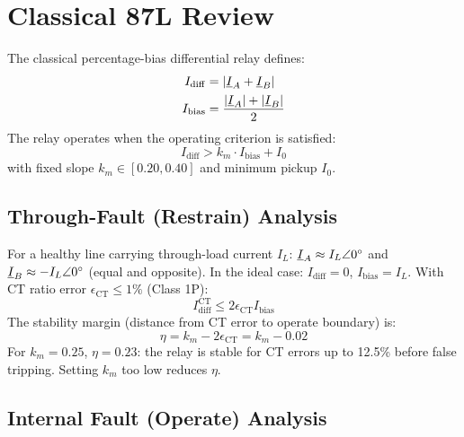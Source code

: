\section{Classical 87L Review}
\label{sec:ch4_review}

The classical percentage-bias differential relay defines:
\begin{align}
  I_\mathrm{diff} &= |\underline{I}_A + \underline{I}_B|
  \label{eq:ch4_idiff_def} \\
  I_\mathrm{bias} &= \frac{|\underline{I}_A| + |\underline{I}_B|}{2}
  \label{eq:ch4_ibias_def}
\end{align}
The relay operates when the operating criterion is satisfied:
\begin{equation}
  \boxed{I_\mathrm{diff} > k_m \cdot I_\mathrm{bias} + I_0}
  \label{eq:ch4_87l_criterion}
\end{equation}
with fixed slope $k_m \in [0.20, 0.40]$ and minimum pickup $I_0$.

\subsection{Through-Fault (Restrain) Analysis}

For a healthy line carrying through-load current $I_L$:
$\underline{I}_A \approx I_L\angle 0^\circ{}$ and $\underline{I}_B \approx -I_L\angle 0^\circ{}$
(equal and opposite). In the ideal case:
$I_\mathrm{diff} = 0$, $I_\mathrm{bias} = I_L$.
With CT ratio error $\epsilon_\mathrm{CT} \leq 1\%$ (Class 1P):
\begin{equation}
  I_\mathrm{diff}^\mathrm{CT} \leq 2\epsilon_\mathrm{CT} I_\mathrm{bias}
  \label{eq:ch4_ct_error}
\end{equation}
The stability margin (distance from CT error to operate boundary) is:
\begin{equation}
  \eta = k_m - 2\epsilon_\mathrm{CT} = k_m - 0.02
  \label{eq:ch4_stability_margin}
\end{equation}
For $k_m = 0.25$, $\eta = 0.23$: the relay is stable for CT errors up to
12.5\% before false tripping. Setting $k_m$ too low reduces $\eta$.

\subsection{Internal Fault (Operate) Analysis}

